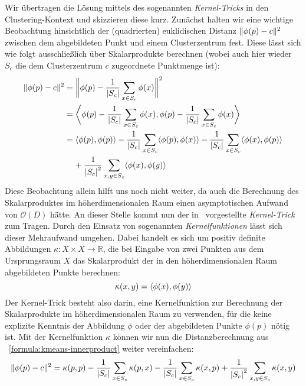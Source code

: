 Wir übertragen die Lösung mittels des sogenannten \emph{Kernel-Tricks} in den Clustering-Kontext und skizzieren diese kurz.
Zunächst halten wir eine wichtige Beobachtung hinsichtlich der (quadrierten) euklidischen Distanz $\lVert {\phi(p)} - {c} \rVert^2$
zwischen dem abgebildeten Punkt und einem Clusterzentrum fest. Diese lässt sich wie folgt ausschließlich über Skalarprodukte
berechnen (wobei auch hier wieder $S_c$ die dem Clusterzentrum $c$ zugeordnete Punktmenge ist):
\begin{align}
\label{formula:kmeans-innerproduct}
	\lVert {\phi(p)} - {c} \rVert^2 &= \bigg\lVert \phi(p) - \frac{1}{\left|S_c\right|} \sum_{x \in S_c} \phi(x) \bigg\rVert^2 \notag \\
	&= \bigg\langle \phi(p) - \frac{1}{\left|S_c\right|} \sum_{x \in S_c} \phi(x),
		\phi(p) - \frac{1}{\left|S_c\right|} \sum_{x \in S_c} \phi(x) \bigg\rangle \notag \\
	&= \langle \phi(p), \phi(p) \rangle - \frac{1}{\left|S_c\right|} \sum_{x \in S_c} \langle \phi(p), \phi(x) \rangle
		- \frac{1}{\left|S_c\right|} \sum_{x \in S_c} \langle \phi(x), \phi(p) \rangle \notag \\
		& \hspace{0.4cm} + \frac{1}{\left|S_c\right|^2} \sum_{x,y \in S_c} \langle \phi(x), \phi(y) \rangle
\end{align}
Diese Beobachtung allein hilft uns noch nicht weiter, da auch die Berechnung des Skalarproduktes im höherdimensionalen
Raum einen asymptotischen Aufwand von $\mathcal{O}(D)$ hätte. An dieser Stelle kommt nun der in~\cite{BoserGV92} vorgestellte
\emph{Kernel-Trick} zum Tragen. Durch den Einsatz von sogenannten \emph{Kernelfunktionen} lässt sich dieser Mehraufwand
umgehen. Dabei handelt es sich um positiv definite Abbildungen $\kappa : X \times X \rightarrow \mathbb{R}$, die bei Eingabe von
zwei Punkten aus dem Ursprungsraum $X$ das Skalarprodukt der in den höherdimensionalen Raum abgebildeten Punkte berechnen:
\[ \kappa(x,y) = \langle \phi(x), \phi(y) \rangle \]
Der Kernel-Trick besteht also darin, eine Kernelfunktion zur Berechnung der Skalarprodukte im höherdimensionalen Raum zu
verwenden, für die keine explizite Kenntnis der Abbildung $\phi$ oder der abgebildeten Punkte $\phi(p)$ nötig ist.
Mit der Kernelfunktion $\kappa$ können wir nun die Distanzberechnung aus ~\ref{formula:kmeans-innerproduct} weiter vereinfachen:
\begin{align}
\label{formula:kernel-kmeans}
	\lVert {\phi(p)} - {c} \rVert^2 = \kappa(p,p) - \frac{1}{\left|S_c\right|} \sum_{x \in S_c} \kappa(p, x)
		- \frac{1}{\left|S_c\right|} \sum_{x \in S_c} \kappa(x, p)
		+ \frac{1}{\left|S_c\right|^2} \sum_{x,y \in S_c} \kappa(x, y)
\end{align}

